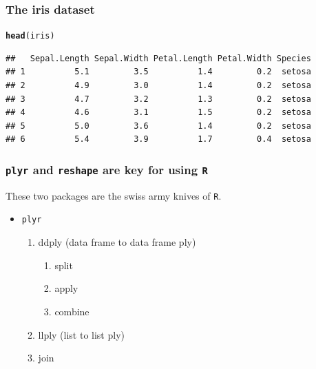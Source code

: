 \documentclass{beamer}\usepackage[]{graphicx}\usepackage[]{color}
\makeatletter
\newcommand{\hlstd}[1]{\textcolor[rgb]{0.345,0.345,0.345}{#1}}%
\newcommand{\hlkwd}[1]{\textcolor[rgb]{0.737,0.353,0.396}{\textbf{#1}}}%
\newenvironment{kframe}{%
 \def\at@end@of@kframe{}%
 \ifinner\ifhmode%
  \def\at@end@of@kframe{\end{minipage}}%
  \begin{minipage}{\columnwidth}%
 \fi\fi%
 \def\FrameCommand##1{\hskip\@totalleftmargin \hskip-\fboxsep
 \colorbox{shadecolor}{##1}\hskip-\fboxsep
     \hskip-\linewidth \hskip-\@totalleftmargin \hskip\columnwidth}%
 \MakeFramed {\advance\hsize-\width
   \@totalleftmargin\z@ \linewidth\hsize
   \@setminipage}}%
 {\par\unskip\endMakeFramed%
 \at@end@of@kframe}
\newenvironment{knitrout}{}{} %
\makeatother
\begin{document}

\begin{frame}[fragile]
\frametitle{The iris dataset}
\begin{knitrout}\footnotesize
{}\color{fgcolor}\begin{kframe}
\begin{alltt}
\hlkwd{head}\hlstd{(iris)}
\end{alltt}
\begin{verbatim}
##   Sepal.Length Sepal.Width Petal.Length Petal.Width Species
## 1          5.1         3.5          1.4         0.2  setosa
## 2          4.9         3.0          1.4         0.2  setosa
## 3          4.7         3.2          1.3         0.2  setosa
## 4          4.6         3.1          1.5         0.2  setosa
## 5          5.0         3.6          1.4         0.2  setosa
## 6          5.4         3.9          1.7         0.4  setosa
\end{verbatim}
\end{kframe}
\end{knitrout}
\end{frame}


\begin{frame}[fragile]
\frametitle{\texttt{plyr} and \texttt{reshape} are key for using \texttt{R}}
These two packages are the swiss army knives of \texttt{R}.
\begin{itemize}
\item \texttt{plyr}
    \begin{enumerate}
    \item ddply (data frame to data frame ply)
        \begin{enumerate}
        \item split
        \item apply
        \item combine
        \end{enumerate}
    \item llply (list to list ply)
    \item join
    \end{enumerate}
\end{itemize}
\end{frame}

\end{document}
